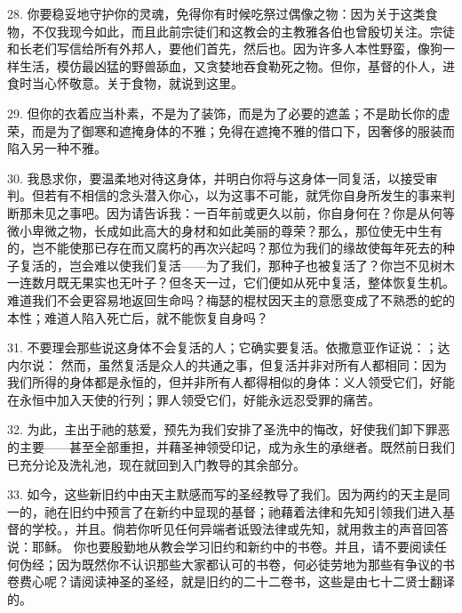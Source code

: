 28. 你要稳妥地守护你的灵魂，免得你有时候吃祭过偶像之物：因为关于这类食物，不仅我现今如此，而且此前宗徒们和这教会的主教雅各伯也曾殷切关注。宗徒和长老们写信给所有外邦人，要他们首先，然后也。因为许多人本性野蛮，像狗一样生活，模仿最凶猛的野兽舔血，又贪婪地吞食勒死之物。但你，基督的仆人，进食时当心怀敬意。关于食物，就说到这里。\par

\par

29. 但你的衣着应当朴素，不是为了装饰，而是为了必要的遮盖；不是助长你的虚荣，而是为了御寒和遮掩身体的不雅；免得在遮掩不雅的借口下，因奢侈的服装而陷入另一种不雅。\par

\par

30. 我恳求你，要温柔地对待这身体，并明白你将与这身体一同复活，以接受审判。但若有不相信的念头潜入你心，以为这事不可能，就凭你自身所发生的事来判断那未见之事吧。因为请告诉我：一百年前或更久以前，你自身何在？你是从何等微小卑微之物，长成如此高大的身材和如此美丽的尊荣？那么，那位使无中生有的，岂不能使那已存在而又腐朽的再次兴起吗？那位为我们的缘故使每年死去的种子复活的，岂会难以使我们复活——为了我们，那种子也被复活了？你岂不见树木一连数月既无果实也无叶子？但冬天一过，它们便如从死中复活，整体恢复生机。难道我们不会更容易地返回生命吗？梅瑟的棍杖因天主的意愿变成了不熟悉的蛇的本性；难道人陷入死亡后，就不能恢复自身吗？\par

31. 不要理会那些说这身体不会复活的人；它确实要复活。依撒意亚作证说：；达内尔说： 然而，虽然复活是众人的共通之事，但复活并非对所有人都相同：因为我们所得的身体都是永恒的，但并非所有人都得相似的身体：义人领受它们，好能在永恒中加入天使的行列；罪人领受它们，好能永远忍受罪的痛苦。\par

\par

32. 为此，主出于祂的慈爱，预先为我们安排了圣洗中的悔改，好使我们卸下罪恶的主要——甚至全部重担，并藉圣神领受印记，成为永生的承继者。既然前日我们已充分论及洗礼池，现在就回到入门教导的其余部分。\par

\par

33. 如今，这些新旧约中由天主默感而写的圣经教导了我们。因为两约的天主是同一的，祂在旧约中预言了在新约中显现的基督；祂藉着法律和先知引领我们进入基督的学校。，并且。倘若你听见任何异端者诋毁法律或先知，就用救主的声音回答说：耶稣。 你也要殷勤地从教会学习旧约和新约中的书卷。并且，请不要阅读任何伪经；因为既然你不认识那些大家都认可的书卷，何必徒劳地为那些有争议的书卷费心呢？请阅读神圣的圣经，就是旧约的二十二卷书，这些是由七十二贤士翻译的。\par

